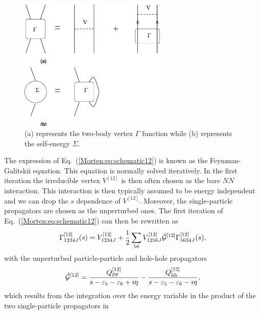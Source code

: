 \begin{figure}[tbh]
	\begin{center}
      	\includegraphics[width=7cm]{sigmagamma.eps}
	\end{center}
      \caption{(a) represents the two-body vertex $\Gamma$ function while (b)  
               represents the self-energy $\Sigma$.}
      \label{Morten:fig:selfcons12}
\end{figure}
The expression of Eq.~(\ref{Morten:eq:schematic12}) is known as the
Feynman-Galitskii equation. This equation is normally solved
iteratively.  In the first iteration the irreducible vertex $V^{[12]}$
is then often chosen as the bare $NN$ interaction. This interaction is
then typically assumed to be energy independent and we can drop the
$s$ dependence of $V^{[12]}$. Moreover, the single-particle
propagators are chosen as the unperturbed ones. The first iteration of
Eq.~(\ref{Morten:eq:schematic12}) can then be rewritten as
\begin{equation}
      \Gamma^{[12]}_{1234J}(s) = 
      V^{[12]}_{1234J}+\frac{1}{2}
      \sum_{56}
      V^{[12]}_{1256J}\hat{{\cal G}}^{[12]}
      \Gamma^{[12]}_{5634J}(s),
      \label{Morten:eq:first12}
\end{equation}
with the unperturbed particle-particle and hole-hole propagators 
\begin{equation}
    \hat{{\cal G}}^{[12]}=
    \frac{Q^{[12]}_{\mathrm{pp}}}{s-\varepsilon_5-\varepsilon_6+\imath \eta}-
    \frac{Q^{[12]}_{\mathrm{hh}}}{s-\varepsilon_5-\varepsilon_6-\imath \eta},
    \label{Morten:eq:paulioperator12}
\end{equation}
which results from the integration over the energy variable in the
product of the two single-particle propagators in
